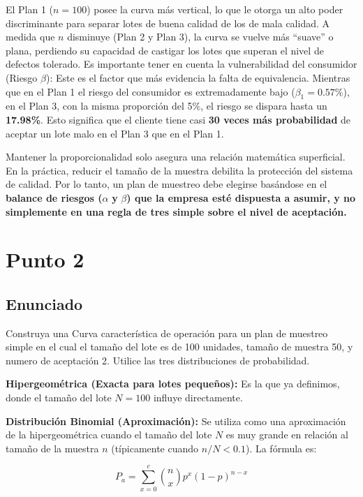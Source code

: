 \documentclass[
  12pt,
]{article}
\begin{document}
El Plan 1 (\(n=100\)) posee la curva más vertical, lo que le otorga un
alto poder discriminante para separar lotes de buena calidad de los de
mala calidad. A medida que \(n\) disminuye (Plan 2 y Plan 3), la curva
se vuelve más ``suave'' o plana, perdiendo su capacidad de castigar los
lotes que superan el nivel de defectos tolerado. Es importante tener en
cuenta la vulnerabilidad del consumidor (Riesgo \(\beta\)): Este es el
factor que más evidencia la falta de equivalencia. Mientras que en el
Plan 1 el riesgo del consumidor es extremadamente bajo
(\(\beta_1 = 0.57\%\)), en el Plan 3, con la misma proporción del 5\%,
el riesgo se dispara hasta un \textbf{17.98\%}. Esto significa que el
cliente tiene casi \textbf{30 veces más probabilidad} de aceptar un lote
malo en el Plan 3 que en el Plan 1.

Mantener la proporcionalidad solo asegura una relación matemática
superficial. En la práctica, reducir el tamaño de la muestra debilita la
protección del sistema de calidad. Por lo tanto, un plan de muestreo
debe elegirse basándose en el \textbf{balance de riesgos (}\(\alpha\)
\textbf{y} \(\beta\)\textbf{) que la empresa esté dispuesta a asumir, y
no simplemente en una regla de tres simple sobre el nivel de
aceptación.}

\section{\texorpdfstring{\textbf{Punto 2}}{Punto 2}}\label{punto-2}

\subsection{Enunciado}\label{enunciado-1}

Construya una Curva característica de operación para un plan de muestreo
simple en el cual el tamaño del lote es de 100 unidades, tamaño de
muestra 50, y numero de aceptación 2. Utilice las tres distribuciones de
probabilidad.

\textbf{Hipergeométrica (Exacta para lotes pequeños):} Es la que ya
definimos, donde el tamaño del lote \(N=100\) influye directamente.

\textbf{Distribución Binomial (Aproximación):} Se utiliza como una
aproximación de la hipergeométrica cuando el tamaño del lote \(N\) es
muy grande en relación al tamaño de la muestra \(n\) (típicamente cuando
\(n/N < 0.1\)). La fórmula es:

\[P_a = \sum_{x=0}^{c} \binom{n}{x} p^x (1-p)^{n-x}\]
\end{document}
